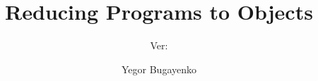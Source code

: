 \documentclass[acmsmall,nonacm,11pt]{acmart}
\title{Reducing Programs to Objects}
\subtitle{
  Ver:
  \texorpdfstring{
    \href{https://github.com/REPOSITORY/releases/tag/0.0.0}
      {\ff{0.0.0}}
  }{0.0.0}
}
\author{Yegor Bugayenko}
\affiliation{\institution{Huawei}\country{Russia}\city{Moscow}}
\begin{document}
\raggedbottom

\maketitle






\raggedright


\end{document}
